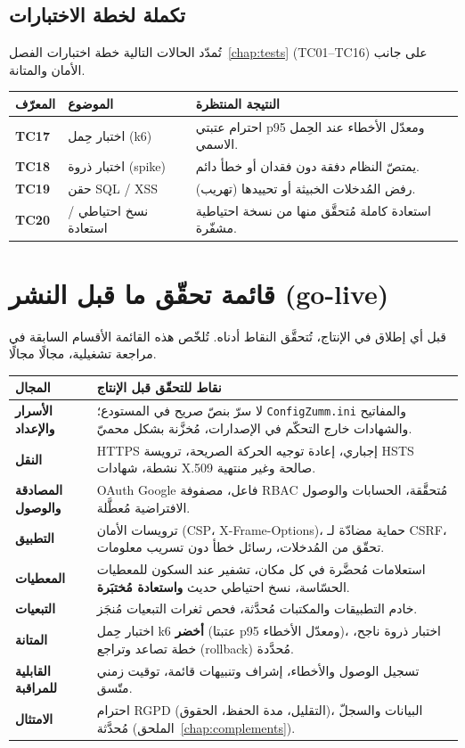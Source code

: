 \subsection{تكملة لخطة الاختبارات}
تُمدّد الحالات التالية خطة اختبارات الفصل~\ref{chap:tests} (TC01--TC16) على
جانب الأمان والمتانة.
\begin{xltabular}{\textwidth}{>{\bfseries}p{1.6cm} p{4.4cm} X}
\toprule
\textbf{المعرّف} & \textbf{الموضوع} & \textbf{النتيجة المنتظرة} \\
\midrule
\endhead
TC17 & اختبار حِمل (k6) & احترام عتبتي p95 ومعدّل الأخطاء عند الحِمل الاسمي. \\
TC18 & اختبار ذروة (spike) & يمتصّ النظام دفقة دون فقدان أو خطأ دائم. \\
TC19 & حقن SQL / XSS & رفض المُدخلات الخبيثة أو تحييدها (تهريب). \\
TC20 & نسخ احتياطي / استعادة & استعادة كاملة مُتحقَّق منها من نسخة احتياطية مشفّرة. \\
\bottomrule
\end{xltabular}

\section{قائمة تحقّق ما قبل النشر (go-live)}
قبل أي إطلاق في الإنتاج، تُتحقَّق النقاط أدناه. تُلخّص هذه القائمة الأقسام
السابقة في مراجعة تشغيلية، مجالًا مجالًا.
\begin{xltabular}{\textwidth}{>{\bfseries}p{3.4cm} X}
\toprule
\textbf{المجال} & \textbf{نقاط للتحقّق قبل الإنتاج} \\
\midrule
\endhead
الأسرار والإعداد & لا سرّ بنصّ صريح في المستودع؛ \texttt{ConfigZumm.ini} والمفاتيح والشهادات خارج التحكّم في الإصدارات، مُخزَّنة بشكل محميّ. \\
النقل & HTTPS إجباري، إعادة توجيه الحركة الصريحة، ترويسة HSTS نشطة، شهادات X.509 صالحة وغير منتهية. \\
المصادقة والوصول & OAuth Google فاعل، مصفوفة RBAC مُتحقَّقة، الحسابات والوصول الافتراضية مُعطَّلة. \\
التطبيق & ترويسات الأمان (CSP، X-Frame-Options)، حماية مضادّة لـ CSRF، تحقّق من المُدخلات، رسائل خطأ دون تسريب معلومات. \\
المعطيات & استعلامات مُحضَّرة في كل مكان، تشفير عند السكون للمعطيات الحسّاسة، نسخ احتياطي حديث \textbf{واستعادة مُختبَرة}. \\
التبعيات & خادم التطبيقات والمكتبات مُحدَّثة، فحص ثغرات التبعيات مُنجَز. \\
المتانة & اختبار حِمل k6 \textbf{أخضر} (عتبتا p95 ومعدّل الأخطاء)، اختبار ذروة ناجح، خطة تصاعد وتراجع (rollback) مُحدَّدة. \\
القابلية للمراقبة & تسجيل الوصول والأخطاء، إشراف وتنبيهات قائمة، توقيت زمني متّسق. \\
الامتثال & احترام RGPD (التقليل، مدة الحفظ، الحقوق)، البيانات والسجلّ مُحدَّثة (الملحق~\ref{chap:complements}). \\
\bottomrule
\end{xltabular}

